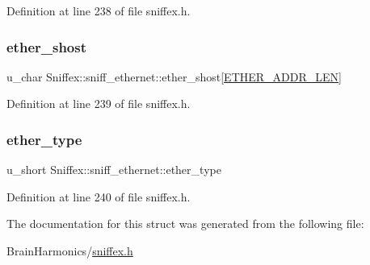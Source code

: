 Definition at line 238 of file sniffex.\+h.

\mbox{\label{struct_sniffex_1_1sniff__ethernet_af40407403f51872c064c28298441b2d9}} 
\subsubsection{\texorpdfstring{ether\+\_\+shost}{ether\_shost}}
{\footnotesize\ttfamily u\+\_\+char Sniffex\+::sniff\+\_\+ethernet\+::ether\+\_\+shost\mbox{[}\hyperlink{sniffex_8h_abf4fcaacb1ad2010711b7c880ec2ed20}{E\+T\+H\+E\+R\+\_\+\+A\+D\+D\+R\+\_\+\+L\+EN}\mbox{]}}



Definition at line 239 of file sniffex.\+h.

\mbox{\label{struct_sniffex_1_1sniff__ethernet_a31b8a8e9232feffeeb747f949580753a}} 
\subsubsection{\texorpdfstring{ether\+\_\+type}{ether\_type}}
{\footnotesize\ttfamily u\+\_\+short Sniffex\+::sniff\+\_\+ethernet\+::ether\+\_\+type}



Definition at line 240 of file sniffex.\+h.



The documentation for this struct was generated from the following file\+:\begin{DoxyCompactItemize}
\item 
Brain\+Harmonics/\hyperlink{sniffex_8h}{sniffex.\+h}\end{DoxyCompactItemize}
